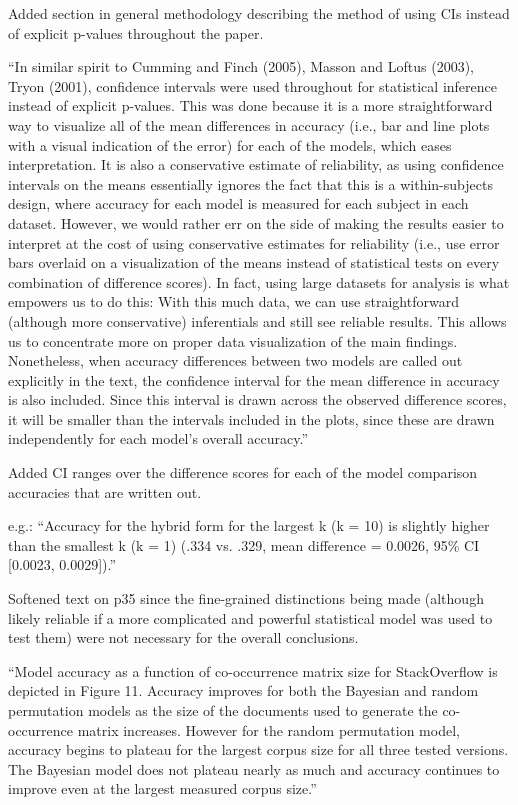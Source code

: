 \documentclass[answers,12pt]{exam}
\begin{document}
\begin{questions}
\begin{solution}
Added section in general methodology describing the method of using CIs instead of explicit p-values throughout the paper.

``In similar spirit to Cumming and Finch (2005), Masson and Loftus (2003), Tryon (2001), confidence intervals were used throughout for statistical inference instead of explicit p-values. This was done because it is a more straightforward way to visualize all of the mean differences in accuracy (i.e., bar and line plots with a visual indication of the error) for each of the models, which eases interpretation. It is also a conservative estimate of
reliability, as using confidence intervals on the means essentially ignores the fact that this is a within-subjects design, where accuracy for each model is measured for each subject in each dataset. However, we would rather err on the side of making the results easier to interpret at the cost of using conservative estimates for reliability (i.e., use error bars overlaid on a visualization of the means instead of statistical tests on every combination of difference scores). In fact, using large datasets for analysis is what empowers us to do this: With this much data, we can use straightforward (although more conservative) inferentials and still see reliable results. This allows us to concentrate more on proper data visualization of the main findings.
Nonetheless, when accuracy differences between two models are called out explicitly in the text, the confidence interval for the mean difference in accuracy is also included. Since this interval is drawn across the observed difference scores, it will be smaller than the intervals included in the plots, since these are drawn independently for each model’s overall accuracy.''

Added CI ranges over the difference scores for each of the model comparison accuracies that are written out.

e.g.: ``Accuracy for the hybrid form for the largest k (k = 10) is slightly higher than the smallest k (k = 1) (.334 vs. .329, mean difference = 0.0026, 95\% CI [0.0023, 0.0029]).''

Softened text on p35 since the fine-grained distinctions being made (although likely reliable if a more complicated and powerful statistical model was used to test them) were not necessary for the overall conclusions.

``Model accuracy as a function of co-occurrence matrix size for StackOverflow is depicted in Figure 11. Accuracy improves for both the Bayesian and random permutation models as the size of the documents used to generate the co-occurrence matrix increases. However for the random permutation model, accuracy begins to plateau for the largest corpus size for all three tested versions. The Bayesian model does not plateau nearly as much and accuracy continues to improve even at the largest measured corpus size.''


\end{solution}
\end{questions}
\end{document}
